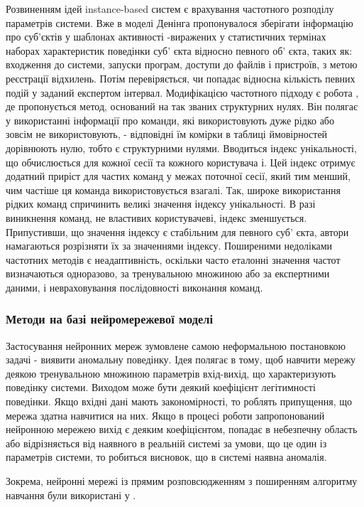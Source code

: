Розвиненням ідей instance-based систем є врахування частотного розподілу
параметрів системи. Вже в моделі Денінга пропонувалося зберігати інформацію про
суб'єктів у шаблонах активності -виражених у статистичних термінах наборах
характеристик поведінки суб' єкта відносно певного об' єкта, таких як: входження
до системи, запуски програм, доступи до файлів і пристроїв, з метою реєстрації відхилень.
Потім перевіряється, чи попадає відносна кількість певних подій у заданий експертом інтервал.
Модифікацією частотного підходу є робота \cite{theus1998intrusion}, де пропонується метод,
оснований на так званих структурних нулях. Він полягає у використанні інформації про команди,
які використовують дуже рідко або зовсім не використовують, - відповідні їм комірки в таблиці
ймовірностей дорівнюють нулю, тобто є структурними нулями. Вводиться індекс унікальності,
що обчислюється для кожної сесії та кожного користувача і. Цей індекс отримує додатний
приріст для частих команд у межах поточної сесії, який тим менший, чим частіше
ця команда використовується взагалі. Так, широке використання рідких команд
спричинить великі значення індексу унікальності. В разі виникнення команд, не
властивих користувачеві, індекс зменшується. Припустивши, що значення індексу є
стабільним для певного суб' єкта, автори намагаються розрізняти їх за значеннями
індексу. Поширеними недоліками частотних методів є неадаптивність, оскільки
часто еталонні значення частот визначаються одноразово, за тренувальною множиною
або за експертними даними, і невраховування послідовності виконання команд.

\subsubsection{Методи на базі нейромережевої моделі}

Застосування нейронних мереж зумовлене самою неформальною постановкою задачі - 
виявити аномальну поведінку. Ідея полягає в тому, щоб навчити мережу деякою
тренувальною множиною параметрів вхід-вихід, що характеризують поведінку системи.
Виходом може бути деякий коефіцієнт легітимності поведінки. Якщо вхідні дані
мають закономірності, то роблять припущення, що мережа здатна навчитися на них.
Якщо в процесі роботи запропонований нейронною мережею вихід є деяким
коефіцієнтом, попадає в небезпечну область або відрізняється від наявного в
реальній системі за умови, що це один із параметрів системи, то робиться
висновок, що в системі наявна аномалія.

Зокрема, нейронні мережі із прямим розповсюдженням з поширенням алгоритму навчання були використані у \cite{shun2008network}.

